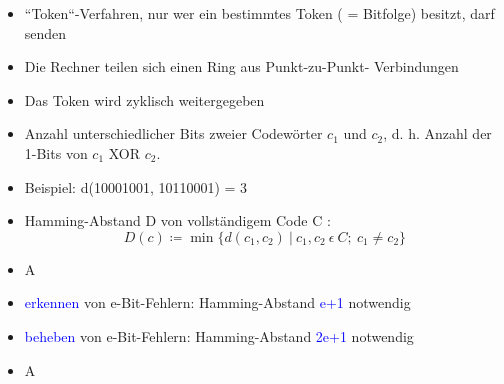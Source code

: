 \begin{itemize}
    \item “Token“-Verfahren, nur wer ein bestimmtes Token ( = Bitfolge) besitzt, darf senden
    \item Die Rechner teilen sich einen Ring aus Punkt-zu-Punkt- Verbindungen
    \item Das Token wird zyklisch weitergegeben
\end{itemize}

\begin{itemize}
    \item Anzahl unterschiedlicher Bits zweier Codewörter $c_1$ und $c_2$, d. h. Anzahl der 1-Bits von $c_1$ XOR $c_2$.
    \item Beispiel: d(10001001, 10110001) = 3
    \item Hamming-Abstand D von vollständigem Code C : \[ D(c)\coloneqq \min\{d(c_1 ,c_2)\ |\ c_1 ,c_2\ \epsilon \ C; \ c_1 \neq c_2\}\]
\end{itemize}

\begin{itemize}
    \item \todo A
\end{itemize}

\begin{itemize}
    \item \textcolor{blue}{erkennen} von e-Bit-Fehlern: Hamming-Abstand \textcolor{blue}{e+1} notwendig
    \item \textcolor{blue}{beheben} von e-Bit-Fehlern: Hamming-Abstand \textcolor{blue}{2e+1} notwendig
\end{itemize}

\begin{itemize}
    \item \todo A
\end{itemize}

